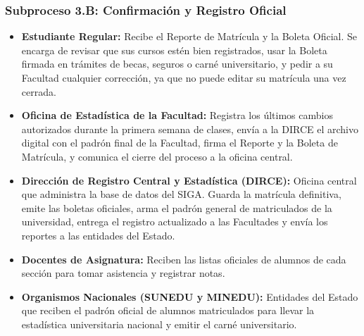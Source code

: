 \subsubsection{Subproceso 3.B: Confirmación y Registro Oficial}

\begin{itemize}
    \item \textbf{Estudiante Regular:} Recibe el Reporte de Matrícula y la Boleta Oficial. Se encarga de revisar que sus cursos estén bien registrados, usar la Boleta firmada en trámites de becas, seguros o carné universitario, y pedir a su Facultad cualquier corrección, ya que no puede editar su matrícula una vez cerrada.

    \item \textbf{Oficina de Estadística de la Facultad:} Registra los últimos cambios autorizados durante la primera semana de clases, envía a la DIRCE el archivo digital con el padrón final de la Facultad, firma el Reporte y la Boleta de Matrícula, y comunica el cierre del proceso a la oficina central.

    \item \textbf{Dirección de Registro Central y Estadística (DIRCE):} Oficina central que administra la base de datos del SIGA. Guarda la matrícula definitiva, emite las boletas oficiales, arma el padrón general de matriculados de la universidad, entrega el registro actualizado a las Facultades y envía los reportes a las entidades del Estado.

    \item \textbf{Docentes de Asignatura:} Reciben las listas oficiales de alumnos de cada sección para tomar asistencia y registrar notas.

    \item \textbf{Organismos Nacionales (SUNEDU y MINEDU):} Entidades del Estado que reciben el padrón oficial de alumnos matriculados para llevar la estadística universitaria nacional y emitir el carné universitario.
\end{itemize}
